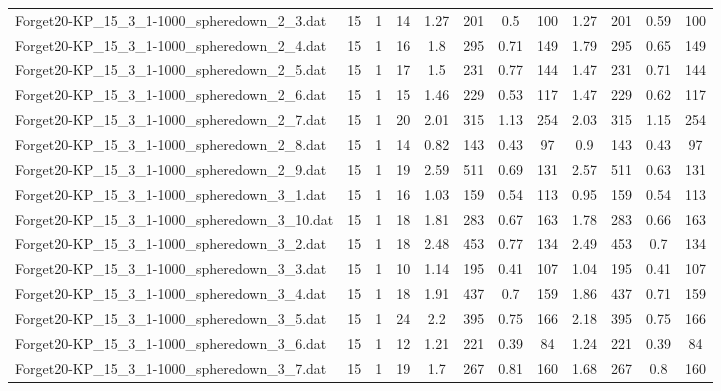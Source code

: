 \begin{sidewaystable}[!ht]
{\begin{tabular}{lccccccccccc}
Forget20-KP\_15\_3\_1-1000\_spheredown\_2\_3.dat & 15 & 1 & 14 & 1.27 & 201 &  \textcolor{blue2}{0.5} & 100 & 1.27 & 201 & 0.59 & 100 \\
Forget20-KP\_15\_3\_1-1000\_spheredown\_2\_4.dat & 15 & 1 & 16 & 1.8 & 295 & 0.71 & 149 & 1.79 & 295 &  \textcolor{blue2}{0.65} & 149 \\
Forget20-KP\_15\_3\_1-1000\_spheredown\_2\_5.dat & 15 & 1 & 17 & 1.5 & 231 & 0.77 & 144 & 1.47 & 231 &  \textcolor{blue2}{0.71} & 144 \\
Forget20-KP\_15\_3\_1-1000\_spheredown\_2\_6.dat & 15 & 1 & 15 & 1.46 & 229 &  \textcolor{blue2}{0.53} & 117 & 1.47 & 229 & 0.62 & 117 \\
Forget20-KP\_15\_3\_1-1000\_spheredown\_2\_7.dat & 15 & 1 & 20 & 2.01 & 315 &  \textcolor{blue2}{1.13} & 254 & 2.03 & 315 & 1.15 & 254 \\
Forget20-KP\_15\_3\_1-1000\_spheredown\_2\_8.dat & 15 & 1 & 14 & 0.82 & 143 &  \textcolor{blue2}{0.43} & 97 & 0.9 & 143 &  \textcolor{blue2}{0.43} & 97 \\
Forget20-KP\_15\_3\_1-1000\_spheredown\_2\_9.dat & 15 & 1 & 19 & 2.59 & 511 & 0.69 & 131 & 2.57 & 511 &  \textcolor{blue2}{0.63} & 131 \\
Forget20-KP\_15\_3\_1-1000\_spheredown\_3\_1.dat & 15 & 1 & 16 & 1.03 & 159 &  \textcolor{blue2}{0.54} & 113 & 0.95 & 159 &  \textcolor{blue2}{0.54} & 113 \\
Forget20-KP\_15\_3\_1-1000\_spheredown\_3\_10.dat & 15 & 1 & 18 & 1.81 & 283 & 0.67 & 163 & 1.78 & 283 &  \textcolor{blue2}{0.66} & 163 \\
Forget20-KP\_15\_3\_1-1000\_spheredown\_3\_2.dat & 15 & 1 & 18 & 2.48 & 453 & 0.77 & 134 & 2.49 & 453 &  \textcolor{blue2}{0.7} & 134 \\
Forget20-KP\_15\_3\_1-1000\_spheredown\_3\_3.dat & 15 & 1 & 10 & 1.14 & 195 &  \textcolor{blue2}{0.41} & 107 & 1.04 & 195 &  \textcolor{blue2}{0.41} & 107 \\
Forget20-KP\_15\_3\_1-1000\_spheredown\_3\_4.dat & 15 & 1 & 18 & 1.91 & 437 &  \textcolor{blue2}{0.7} & 159 & 1.86 & 437 & 0.71 & 159 \\
Forget20-KP\_15\_3\_1-1000\_spheredown\_3\_5.dat & 15 & 1 & 24 & 2.2 & 395 & 0.75 & 166 & 2.18 & 395 & 0.75 & 166 \\
Forget20-KP\_15\_3\_1-1000\_spheredown\_3\_6.dat & 15 & 1 & 12 & 1.21 & 221 &  \textcolor{blue2}{0.39} & 84 & 1.24 & 221 &  \textcolor{blue2}{0.39} & 84 \\
Forget20-KP\_15\_3\_1-1000\_spheredown\_3\_7.dat & 15 & 1 & 19 & 1.7 & 267 & 0.81 & 160 & 1.68 & 267 &  \textcolor{blue2}{0.8} & 160 \\

\end{tabular}}
\end{sidewaystable}
